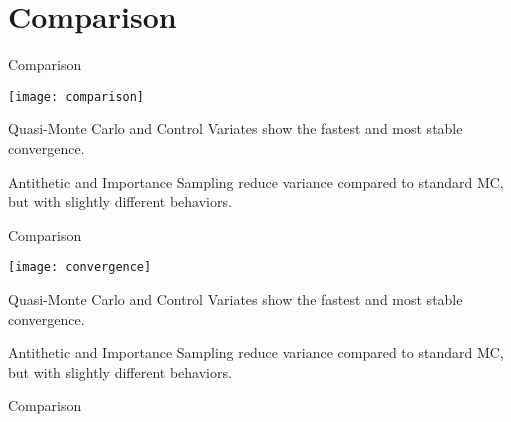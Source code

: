 \documentclass[aspectratio=169,xcolor=dvipsnames]{beamer}
\begin{document}
	\section{Comparison}
	\begin{frame}{Comparison}
		\begin{center}
			\texttt{[image: comparison]}
		\end{center}
	
	Quasi-Monte Carlo and Control Variates show the fastest and most stable convergence.
	
	Antithetic and Importance Sampling reduce variance compared to standard MC, but with slightly different behaviors.
	\end{frame}

\begin{frame}{Comparison}
	\begin{center}
		\texttt{[image: convergence]}
	\end{center}
	
	Quasi-Monte Carlo and Control Variates show the fastest and most stable convergence.
	
	Antithetic and Importance Sampling reduce variance compared to standard MC, but with slightly different behaviors.
\end{frame}
	
	
\begin{frame}{Comparison}
		\begin{table}
			\centering
		\end{table}
	\end{frame}
	
\end{document}
